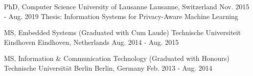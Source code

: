 

\begin{cventries}

  \vspace{-0.2cm}
  \cventry
    {PhD, Computer Science} %
    {University of Lausanne} %
    {Lausanne, Switzerland} %
    {Nov. 2015 - Aug. 2019} %
    {
      Thesis: Information Systems for Privacy-Aware Machine Learning
    }
    
    \cventry
    {MS, Embedded Systems (Graduated with Cum Laude)}
    {Technische Universiteit Eindhoven}
    {Eindhoven, Netherlands}
    {Aug. 2014 - Aug. 2015}
    {}
	
	\vspace{-0.4cm}
    \cventry
    {MS, Information \& Communication Technology (Graduated with Honours)} %
    {Technische Universität Berlin} %
    {Berlin, Germany} %
    {Feb. 2013 - Aug. 2014} %
    {}
	
	\vspace{-0.9cm}
\end{cventries}
